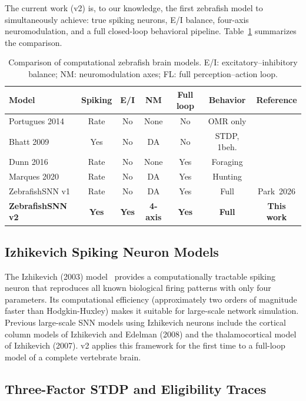 \documentclass[11pt,a4paper]{article}
\begin{document}
The current work (v2) is, to our knowledge, the first zebrafish
model to simultaneously achieve: true spiking neurons, E/I balance,
four-axis neuromodulation, and a full closed-loop behavioral pipeline.
Table~\ref{tab:comparison} summarizes the comparison.

\begin{table}[H]
\centering
\caption{Comparison of computational zebrafish brain models.
  E/I: excitatory--inhibitory balance; NM: neuromodulation axes;
  FL: full perception--action loop.}
\label{tab:comparison}
\small
\begin{tabular}{lcccccc}
\toprule
Model & Spiking & E/I & NM & Full loop & Behavior & Reference \\
\midrule
Portugues 2014 & Rate & No  & None    & No  & OMR only & \cite{portugues2014} \\
Bhatt 2009     & Yes  & No  & DA      & No  & STDP, 1beh. & \cite{bhatt2009} \\
Dunn 2016      & Rate & No  & None    & Yes & Foraging & \cite{dunn2016} \\
Marques 2020   & Rate & No  & DA      & Yes & Hunting  & \cite{marques2020} \\
ZebrafishSNN v1 & Rate & No  & DA     & Yes & Full & Park~2026 \\
\textbf{ZebrafishSNN v2} & \textbf{Yes} & \textbf{Yes} & \textbf{4-axis} & \textbf{Yes} & \textbf{Full} & \textbf{This work} \\
\bottomrule
\end{tabular}
\end{table}

\subsection{Izhikevich Spiking Neuron Models}

The Izhikevich (2003) model~\cite{izhikevich2003} provides a computationally
tractable spiking neuron that reproduces all known biological firing
patterns with only four parameters.
Its computational efficiency (approximately two orders of magnitude faster
than Hodgkin-Huxley) makes it suitable for large-scale network simulation.
Previous large-scale SNN models using Izhikevich neurons include
the cortical column models of Izhikevich and Edelman (2008) and
the thalamocortical model of Izhikevich (2007).
v2 applies this framework for the first time to a full-loop model
of a complete vertebrate brain.

\subsection{Three-Factor STDP and Eligibility Traces}
\end{document}
